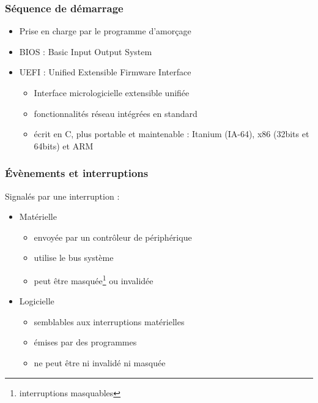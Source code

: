 \begin{frame}
\frametitle{Séquence de démarrage}
\begin{itemize}
\item Prise en charge par le programme d'amorçage
\item BIOS : Basic Input Output System \cite{wp-bios}
\item UEFI : Unified Extensible Firmware Interface \cite{wp-uefi}
\begin{itemize}
\item Interface micrologicielle extensible unifiée
\item fonctionnalités réseau intégrées en standard
\item écrit en C, plus portable et maintenable :  Itanium (IA-64), x86 (32bits et 64bits) et ARM
\end{itemize}

\end{itemize}


\end{frame}



\begin{frame}
\frametitle{Évènements et interruptions}
Signalés par une interruption :
\begin{itemize}
\item Matérielle
\begin{itemize}
\item envoyée par un contrôleur de périphérique
\item utilise le bus système
\item peut être masquée\footnote{interruptions masquables} ou invalidée 
\end{itemize}
\item Logicielle
\begin{itemize}
\item semblables aux interruptions matérielles
\item émises par des programmes
\item ne peut être ni invalidé ni masquée
\end{itemize}
\end{itemize}
\end{frame}



